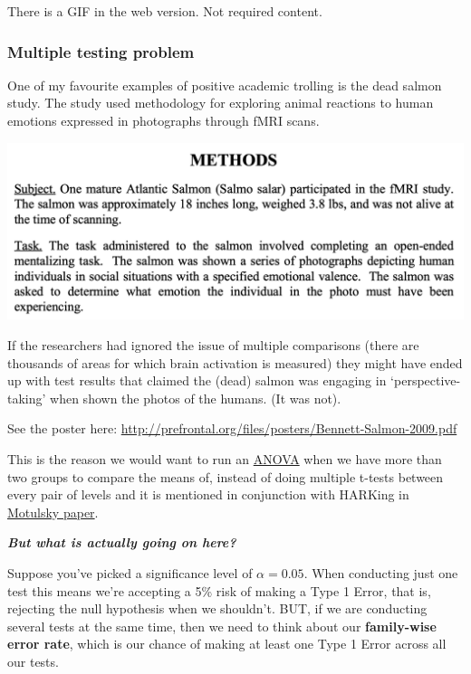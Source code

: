 \documentclass[
  openany]{book}
\begin{document}
There is a GIF in the web version. Not required content.

\hypertarget{multiple-testing-problem}{%
\subsubsection{Multiple testing problem}\label{multiple-testing-problem}}

One of my favourite examples of positive academic trolling is the dead salmon study. The study used methodology for exploring animal reactions to human emotions expressed in photographs through fMRI scans.

\begin{center}\includegraphics[width=0.6\linewidth]{images/m2/salmon} \end{center}

If the researchers had ignored the issue of multiple comparisons (there are thousands of areas for which brain activation is measured) they might have ended up with test results that claimed the (dead) salmon was engaging in `perspective-taking' when shown the photos of the humans. (It was not).

See the poster here: \url{http://prefrontal.org/files/posters/Bennett-Salmon-2009.pdf}

This is the reason we would want to run an \protect\hyperlink{anova}{ANOVA} when we have more than two groups to compare the means of, instead of doing multiple t-tests between every pair of levels and it is mentioned in conjunction with HARKing in \href{https://link.springer.com/article/10.1007\%2Fs00210-014-1037-6}{Motulsky paper}.

\textbf{\emph{But what is actually going on here?}}

Suppose you've picked a significance level of \(\alpha = 0.05\). When conducting just one test this means we're accepting a 5\% risk of making a Type 1 Error, that is, rejecting the null hypothesis when we shouldn't. BUT, if we are conducting several tests at the same time, then we need to think about our \textbf{family-wise error rate}, which is our chance of making at least one Type 1 Error across all our tests.
\end{document}
